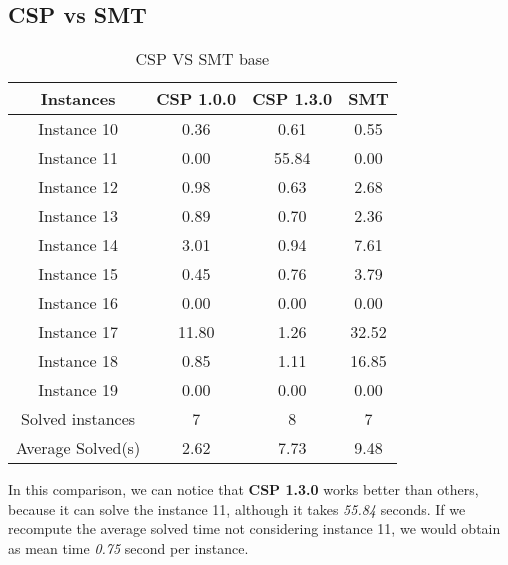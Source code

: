 \subsection{CSP vs SMT}
\begin{table}[!h]
    \centering
    \begin{tabular}{|c|c|c|c|}\hline
        Instances               & CSP 1.0.0  & CSP 1.3.0  & SMT      \\ \hline
        Instance 10             & 0.36   & 0.61   &   0.55  \\ \hline
        Instance 11             & 0.00   & 55.84  &   0.00  \\ \hline
        Instance 12             & 0.98   & 0.63   &   2.68  \\ \hline
        Instance 13             & 0.89   & 0.70   &   2.36  \\ \hline
        Instance 14             & 3.01   & 0.94   &   7.61  \\ \hline
        Instance 15             & 0.45   & 0.76   &   3.79  \\ \hline
        Instance 16             & 0.00   & 0.00   &   0.00  \\ \hline
        Instance 17             & 11.80  & 1.26   &   32.52 \\ \hline
        Instance 18             & 0.85   & 1.11   &   16.85 \\ \hline
        Instance 19             & 0.00   & 0.00   &   0.00  \\ \hline
        Solved   instances      & 7      & 8      & 7        \\ \hline
        Average   Solved(s)       & 2.62   & 7.73   & 9.48     \\ \hline
    \end{tabular}
    \caption{CSP VS SMT base}
    \label{tab:csp-smt-base-comparison}
\end{table}
In this comparison, we can notice that \textbf{CSP 1.3.0} works better than others, because it can solve the instance 11, although it takes \textit{55.84} seconds. If we recompute the average solved time not considering instance 11, we would obtain as mean time \textit{0.75} second per instance.

